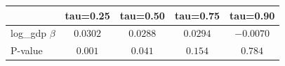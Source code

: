\begin{tabular}{lcccc} \toprule & tau=0.25 & tau=0.50 & tau=0.75 & tau=0.90 \\ \midrule log\_gdp $\beta$ & $0.0302$ & $0.0288$ & $0.0294$ & $-0.0070$ \\ P-value & $0.001$ & $0.041$ & $0.154$ & $0.784$ \\ \bottomrule \end{tabular}